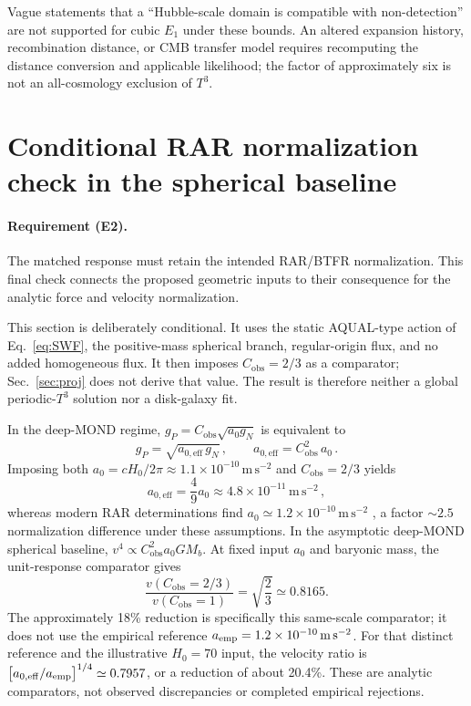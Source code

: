 \documentclass[aps,prd,reprint,superscriptaddress,nofootinbib,floatfix,showkeys]{revtex4-2}
\newcommand{\Tthree}{T^{3}}
\newcommand{\Cobs}{C_{\mathrm{obs}}}
\newcommand{\azero}{a_{0}}
\newcommand{\Hzero}{H_{0}}
\begin{document}
Vague statements that a ``Hubble-scale domain is compatible with non-detection''
are not supported for cubic \(E_1\) under these bounds.
An altered expansion history, recombination distance, or CMB transfer model
requires recomputing the distance conversion and applicable likelihood;
the factor of approximately six is not an all-cosmology exclusion of \(T^3\).

\section{Conditional RAR normalization check in the spherical baseline}
\label{sec:rar}

\paragraph{Requirement (E2).}
The matched response must retain the intended RAR/BTFR normalization.
This final check connects the proposed geometric inputs to their consequence
for the analytic force and velocity normalization.

This section is deliberately conditional.  It uses the static AQUAL-type
action of Eq.~\eqref{eq:SWF}, the positive-mass spherical branch, regular-origin
flux, and no added homogeneous flux.  It then imposes \(\Cobs=2/3\) as a
comparator; Sec.~\ref{sec:proj} does not derive that value.  The result is
therefore neither a global periodic-\(\Tthree\) solution nor a disk-galaxy fit.

In the deep-MOND regime, \(g_{P}=\Cobs\sqrt{\azero g_{N}}\) is equivalent to
\begin{equation}
  g_{P}=\sqrt{a_{0,\mathrm{eff}}\,g_{N}}\,,
  \qquad
  a_{0,\mathrm{eff}} = \Cobs^{2}\,\azero\,.
  \label{eq:a0eff}
\end{equation}
Imposing both \(\azero=c\Hzero/2\pi\approx 1.1\times 10^{-10}\,\mathrm{m\,s^{-2}}\)
and \(\Cobs=2/3\) yields
\begin{equation}
  a_{0,\mathrm{eff}} = \frac{4}{9}\azero
  \approx 4.8\times 10^{-11}\,\mathrm{m\,s^{-2}}\,,
  \label{eq:a0eff-num}
\end{equation}
whereas modern RAR determinations find
\(a_0\simeq 1.2\times 10^{-10}\,\mathrm{m\,s^{-2}}\)
\cite{mcgaugh_rar,lelli_rar}, a factor \(\sim 2.5\) normalization difference
under these assumptions.
In the asymptotic deep-MOND spherical baseline,
\(v^{4}\propto \Cobs^{2}\azero GM_{b}\). At fixed input \(\azero\) and
baryonic mass, the unit-response comparator gives
\begin{equation}
 \frac{v(\Cobs=2/3)}{v(\Cobs=1)}
 =\sqrt{\frac{2}{3}}\simeq0.8165.
 \label{eq:velocity-comparator}
\end{equation}
The approximately 18\% reduction is specifically this same-scale comparator;
it does not use the empirical reference
\(a_{\rm emp}=1.2\times10^{-10}\,\mathrm{m\,s^{-2}}\). For that distinct
reference and the illustrative \(\Hzero=70\) input, the velocity ratio is
\(\bigl[a_{0,\mathrm{eff}}/a_{\rm emp}\bigr]^{1/4}\simeq0.7957\), or a
reduction of about 20.4\%. These are analytic comparators, not observed
discrepancies or completed empirical rejections.
\end{document}

